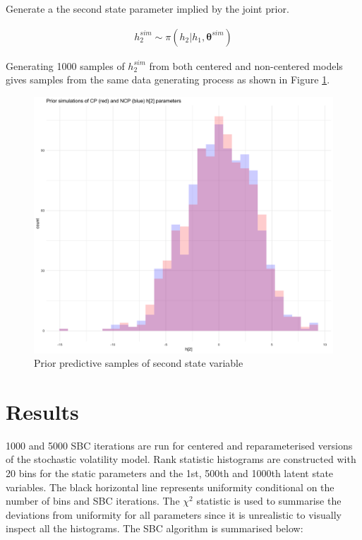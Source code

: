 \documentclass[12pt, a4paper]{article}
\begin{document}
        Generate a the second state parameter implied by the joint prior.

        $$
        \begin{aligned}
        h_2^{sim} \sim \pi (h_2|h_1, \boldsymbol{\theta}^{sim})
        \end{aligned}
        $$

        Generating 1000 samples of $h_2^{sim}$ from both centered and non-centered models gives samples from the same data generating process as shown in Figure \ref{fig:priorpred}. 


        \begin{figure}[h]
            \centering
            \includegraphics[scale=0.1]{figures/ppc_h2.png}
            \caption{Prior predictive samples of second state variable}
            \label{fig:priorpred}
        \end{figure}
        



\section{Results}
    1000 and 5000 SBC iterations are run for centered and reparameterised versions of the stochastic volatility model. Rank statistic histograms are constructed with 20 bins for the static parameters and the 1st, 500th and 1000th latent state variables. The black horizontal line represents uniformity conditional on the number of bins and SBC iterations. The $\chi^2$ statistic is used to summarise the deviations from uniformity for all parameters since it is unrealistic to visually inspect all the histograms. The SBC algorithm is summarised below:
\end{document}
